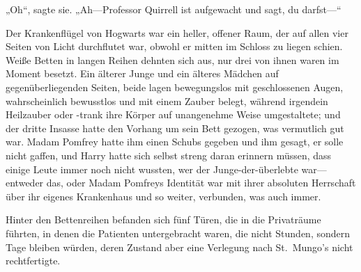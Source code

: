 „Oh“, sagte sie. „Ah—Professor Quirrell ist aufgewacht und sagt, du darfst—“

\later

Der Krankenflügel von Hogwarts war ein heller, offener Raum, der auf allen vier Seiten von Licht durchflutet war, obwohl er mitten im Schloss zu liegen schien. Weiße Betten in langen Reihen dehnten sich aus, nur drei von ihnen waren im Moment besetzt. Ein älterer Junge und ein älteres Mädchen auf gegenüberliegenden Seiten, beide lagen bewegungslos mit geschlossenen Augen, wahrscheinlich bewusstlos und mit einem Zauber belegt, während irgendein Heilzauber oder -trank ihre Körper auf unangenehme Weise umgestaltete; und der dritte Insasse hatte den Vorhang um sein Bett gezogen, was vermutlich gut war. Madam Pomfrey hatte ihm einen Schubs gegeben und ihm gesagt, er solle nicht gaffen, und Harry hatte sich selbst streng daran erinnern müssen, dass einige Leute immer noch nicht wussten, wer der Junge-der-überlebte war—entweder das, oder Madam Pomfreys Identität war mit ihrer absoluten Herrschaft über ihr eigenes Krankenhaus und so weiter, verbunden, was auch immer.

Hinter den Bettenreihen befanden sich fünf Türen, die in die Privaträume führten, in denen die Patienten untergebracht waren, die nicht Stunden, sondern Tage bleiben würden, deren Zustand aber eine Verlegung nach St.~Mungo’s nicht rechtfertigte.

